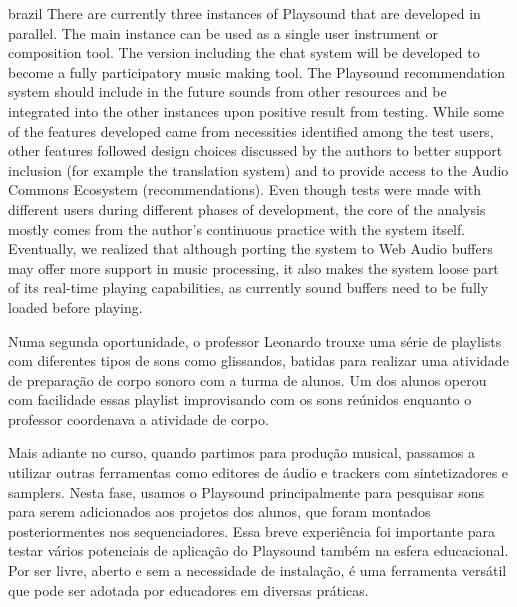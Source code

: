 \begin{otherlanguage*}{brazil}
There are currently three instances of Playsound that are developed in parallel. The main instance can be used as a single user instrument or composition tool. The version including the chat system will be developed to become a fully participatory music making tool. The Playsound recommendation system should include in the future sounds from other resources and be integrated into the other instances upon positive result from testing. While some of the features developed came from necessities identified among the test users, other features followed design choices discussed by the authors to better support inclusion (for example the translation system) and to provide access to the Audio Commons Ecosystem (recommendations). Even though tests were made with different users during different phases of development, the core of the analysis mostly comes from the author's continuous practice with the system itself. Eventually, we realized that although porting the system to Web Audio buffers may offer more support in music processing, it also makes the system loose part of its real-time playing capabilities, as currently sound buffers need to be fully loaded before playing.




Numa segunda oportunidade, o professor Leonardo trouxe uma série de playlists com diferentes tipos de sons como glissandos, batidas para realizar uma atividade de preparação de corpo sonoro com a turma de alunos. Um dos alunos operou com facilidade essas playlist improvisando com os sons reúnidos enquanto o professor coordenava a atividade de corpo. 

Mais adiante no curso, quando partimos para produção musical, passamos a utilizar outras ferramentas como editores de áudio e trackers com sintetizadores e samplers. Nesta fase, usamos o Playsound principalmente para pesquisar sons para serem adicionados aos projetos dos alunos, que foram montados posteriormentes nos sequenciadores. Essa breve experiência foi importante para testar vários potenciais de aplicação do Playsound também na esfera educacional. Por ser livre, aberto e sem a necessidade de instalação, é uma ferramenta versátil que pode ser adotada por educadores em diversas práticas.



\end{otherlanguage*}
